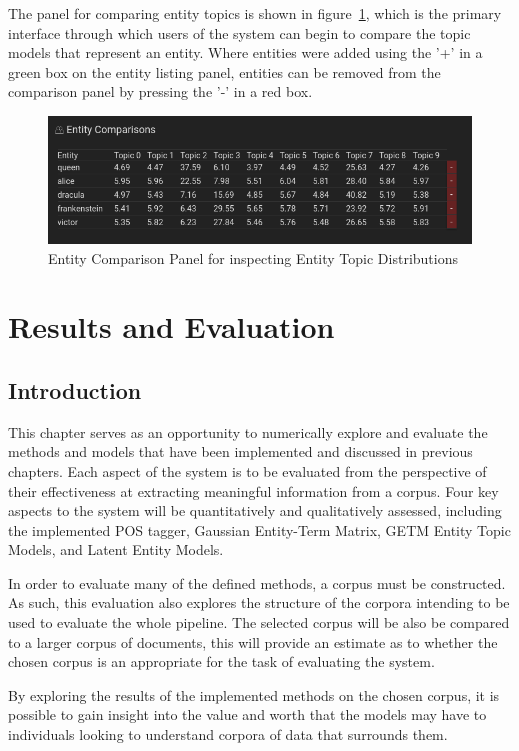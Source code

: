 \documentclass[10pt]{report}
\begin{document}
The panel for comparing entity topics is shown in figure~\ref{fig:entity_compare}, which is the primary interface through which users of the system can begin to compare the topic models that represent an entity. Where entities were added using the '+' in a green box on the entity listing panel, entities can be removed from the comparison panel by pressing the '-' in a red box.

\vfill
\begin{figure}[h]
  \centering
  \includegraphics[scale=0.5]{entity_compare.png}
  \caption{Entity Comparison Panel for inspecting Entity Topic Distributions\label{fig:entity_compare}}
\end{figure}

%
%
%
%
\chapter{Results and Evaluation}
\section{Introduction}
This chapter serves as an opportunity to numerically explore and evaluate the methods and models that have been implemented and discussed in previous chapters. Each aspect of the system is to be evaluated from the perspective of their effectiveness at extracting meaningful information from a corpus. Four key aspects to the system will be quantitatively and qualitatively assessed, including the implemented POS tagger, Gaussian Entity-Term Matrix, GETM Entity Topic Models, and Latent Entity Models.

In order to evaluate many of the defined methods, a corpus must be constructed. As such, this evaluation also explores the structure of the corpora intending to be used to evaluate the whole pipeline. The selected corpus will be also be compared to a larger corpus of documents, this will provide an estimate as to whether the chosen corpus is an appropriate for the task of evaluating the system.

By exploring the results of the implemented methods on the chosen corpus, it is possible to gain insight into the value and worth that the models may have to individuals looking to understand corpora of data that surrounds them. 
\end{document}
